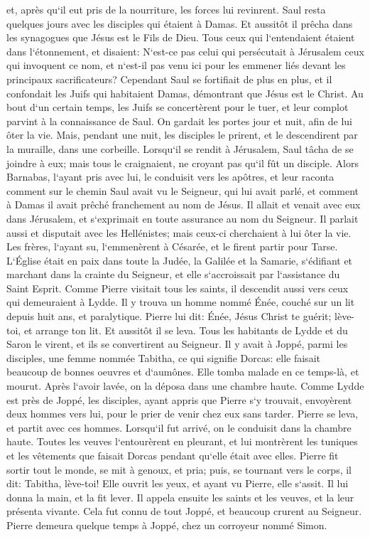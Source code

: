 \verse et, après qu`il eut pris de la nourriture, les forces lui revinrent. Saul resta quelques jours avec les disciples qui étaient à Damas. 
\verse Et aussitôt il prêcha dans les synagogues que Jésus est le Fils de Dieu. 
\verse Tous ceux qui l`entendaient étaient dans l`étonnement, et disaient: N`est-ce pas celui qui persécutait à Jérusalem ceux qui invoquent ce nom, et n`est-il pas venu ici pour les emmener liés devant les principaux sacrificateurs? 
\verse Cependant Saul se fortifiait de plus en plus, et il confondait les Juifs qui habitaient Damas, démontrant que Jésus est le Christ. 
\verse Au bout d`un certain temps, les Juifs se concertèrent pour le tuer, 
\verse et leur complot parvint à la connaissance de Saul. On gardait les portes jour et nuit, afin de lui ôter la vie. 
\verse Mais, pendant une nuit, les disciples le prirent, et le descendirent par la muraille, dans une corbeille. 
\verse Lorsqu`il se rendit à Jérusalem, Saul tâcha de se joindre à eux; mais tous le craignaient, ne croyant pas qu`il fût un disciple. 
\verse Alors Barnabas, l`ayant pris avec lui, le conduisit vers les apôtres, et leur raconta comment sur le chemin Saul avait vu le Seigneur, qui lui avait parlé, et comment à Damas il avait prêché franchement au nom de Jésus. 
\verse Il allait et venait avec eux dans Jérusalem, et s`exprimait en toute assurance au nom du Seigneur. 
\verse Il parlait aussi et disputait avec les Hellénistes; mais ceux-ci cherchaient à lui ôter la vie. 
\verse Les frères, l`ayant su, l`emmenèrent à Césarée, et le firent partir pour Tarse. 
\verse L`Église était en paix dans toute la Judée, la Galilée et la Samarie, s`édifiant et marchant dans la crainte du Seigneur, et elle s`accroissait par l`assistance du Saint Esprit. 
\verse Comme Pierre visitait tous les saints, il descendit aussi vers ceux qui demeuraient à Lydde. 
\verse Il y trouva un homme nommé Énée, couché sur un lit depuis huit ans, et paralytique. 
\verse Pierre lui dit: Énée, Jésus Christ te guérit; lève-toi, et arrange ton lit. Et aussitôt il se leva. 
\verse Tous les habitants de Lydde et du Saron le virent, et ils se convertirent au Seigneur. 
\verse Il y avait à Joppé, parmi les disciples, une femme nommée Tabitha, ce qui signifie Dorcas: elle faisait beaucoup de bonnes oeuvres et d`aumônes. 
\verse Elle tomba malade en ce temps-là, et mourut. Après l`avoir lavée, on la déposa dans une chambre haute. 
\verse Comme Lydde est près de Joppé, les disciples, ayant appris que Pierre s`y trouvait, envoyèrent deux hommes vers lui, pour le prier de venir chez eux sans tarder. 
\verse Pierre se leva, et partit avec ces hommes. Lorsqu`il fut arrivé, on le conduisit dans la chambre haute. Toutes les veuves l`entourèrent en pleurant, et lui montrèrent les tuniques et les vêtements que faisait Dorcas pendant qu`elle était avec elles. 
\verse Pierre fit sortir tout le monde, se mit à genoux, et pria; puis, se tournant vers le corps, il dit: Tabitha, lève-toi! Elle ouvrit les yeux, et ayant vu Pierre, elle s`assit. 
\verse Il lui donna la main, et la fit lever. Il appela ensuite les saints et les veuves, et la leur présenta vivante. 
\verse Cela fut connu de tout Joppé, et beaucoup crurent au Seigneur. 
\verse Pierre demeura quelque temps à Joppé, chez un corroyeur nommé Simon. 

